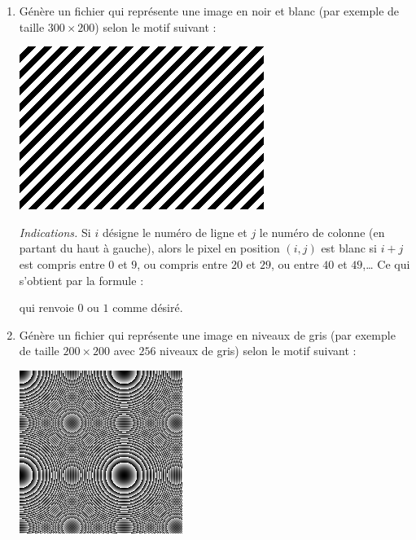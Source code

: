 \documentclass[11pt,class=report,crop=false]{standalone}
\begin{document}
\begin{activite}



\begin{enumerate}
  \item Génère un fichier  qui représente une image en noir et blanc (par exemple de taille $300 \times 200$) selon le motif suivant :
\begin{center}
\includegraphics[scale=\myscale,scale=0.5]{ecran-image_nb}
\end{center}   

\emph{Indications.} Si $i$ désigne le numéro de ligne et $j$ le numéro de colonne (en partant du haut à gauche), alors le pixel en position $(i,j)$ est blanc si $i+j$ est compris entre $0$ et $9$, ou compris entre $20$ et $29$, ou entre $40$ et $49$,\ldots{} Ce qui s'obtient par la formule :

\centerline{}

qui renvoie $0$ ou $1$ comme désiré.

  \item  Génère un fichier  qui représente une image en niveaux de gris (par exemple de taille $200 \times 200$ avec $256$ niveaux de gris) selon le motif suivant :
\begin{center}
\includegraphics[scale=\myscale,scale=0.7]{ecran-image_gris}
\end{center}   


\end{enumerate}
\end{activite}
\end{document}

